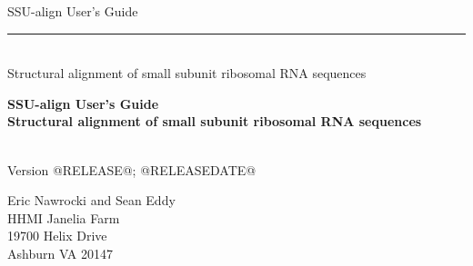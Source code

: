 \begin{titlepage}
{\Large

\vspace*{\fill}

\begin{latexonly}
\noindent
{\Huge SSU-align User's Guide} \\ 
\rule[2pt]{\textwidth}{1pt} \\
\hspace*{\fill} {\large \textsf{Structural alignment of small subunit
    ribosomal RNA sequences}\\}
\end{latexonly}

\begin{htmlonly}
\begin{center}
{\Huge \textbf{SSU-align User's Guide}}\\
{\large \textbf{Structural alignment of small subunit ribosomal RNA
    sequences}}\\
\end{center}
\end{htmlonly}

\vspace*{\fill}

\begin{center}
\textsl{}\\
Version @RELEASE@; @RELEASEDATE@ \\ 

\vspace*{\fill}

Eric Nawrocki and Sean Eddy\\
HHMI Janelia Farm\\
19700 Helix Drive\\
Ashburn VA 20147\\
\textsl{} \\
\end{center}

\vspace*{\fill}

}
\end{titlepage}
